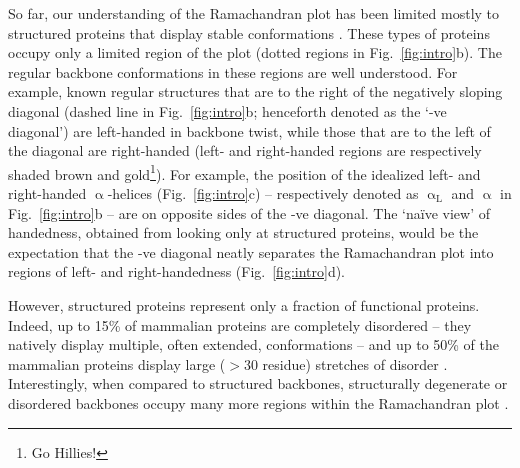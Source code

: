 \documentclass[fleqn,10pt,lineno]{wlpeerj} %
\newcommand{\n}[1]{{\color{black}#1}} %
\newcommand{\Fig}[1]{Fig.~\ref{#1}}
\begin{document}
So far, our understanding of the Ramachandran plot has been limited mostly to structured proteins that display stable conformations \citep{Berman2000,Alberts2002}. These types of proteins occupy only a limited region of the plot (dotted regions in \Fig{fig:intro}b). The regular backbone conformations in these regions are well understood\n{. F}or example, known regular structures that are to the right of the negatively sloping diagonal (dashed line in \Fig{fig:intro}b; henceforth denoted as the `-ve diagonal') are left-handed in backbone twist, while those that are to the left of the diagonal are right-handed (left- and right-handed regions are respectively shaded brown and gold\footnote{Go Hillies!}). For example, the position of the idealized left- and right-handed $\upalpha$-helices (\Fig{fig:intro}c) -- respectively denoted as $\upalpha_\textrm{L}$ and $\upalpha$ in \Fig{fig:intro}b -- are on opposite sides of the -ve diagonal. The `na{\"i}ve view' of handedness, obtained from looking only at structured proteins, would be the expectation that the -ve diagonal neatly separates the Ramachandran plot into regions of left- and right-handedness (\Fig{fig:intro}d).

However, structured proteins represent only a fraction of functional proteins. Indeed, up to 15\% of mammalian proteins are completely disordered -- they natively display multiple, often extended, conformations -- and up to 50\% of the mammalian proteins display large ($>30$ residue) stretches of disorder \citep{Iakoucheva2002,Ward2004,Orosz2011,Mannige2014b}. Interestingly, when compared to structured backbones, structurally degenerate or disordered backbones occupy many more regions within the Ramachandran plot \citep{Beck2008}.
\end{document}

